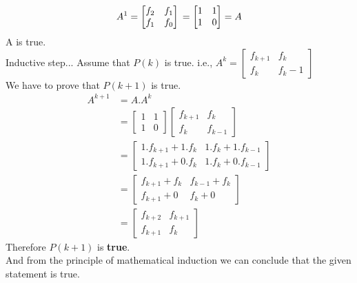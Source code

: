 \documentclass[12pt]{article}
\begin{document}
    \begin{equation}
        A^1= \begin{bmatrix}
            f_{2}&f_{1}\\
            f_{1}&f_{0}
        \end{bmatrix}\\
        =\begin{bmatrix}
            1&1\\
            1&0
        \end{bmatrix}
        = A
    \end{equation}
    A is true.\\
    Inductive step...
    Assume that $P(k)$ is true.
    i.e., $A^k=\begin{bmatrix}
    f_{k+1}&f_k\\
    f_k & f_k-1
    \end{bmatrix}$\\
    We have to prove that $P(k+1)$ is true.
    \begin{equation}
        \begin{split}
            A^{k+1}&=A.A^k\\
            &=\begin{bmatrix}
            1&1\\
            1&0
            \end{bmatrix}
            \begin{bmatrix}
            f_{k+1}& f_k\\
            f_k&f_{k-1}
            \end{bmatrix}\\
            &=\begin{bmatrix}
            1.f_{k+1}+1.f_k &1.f_{k}+1.f_{k-1}\\
            1.f_{k+1}+ 0.f_k & 1.f_k+0.f_{k-1}
            \end{bmatrix}\\
            &=\begin{bmatrix}
            f_{k+1}+f_k & f_{k-1}+f_k\\
            f_{k+1}+0 & f_{k}+0
            \end{bmatrix}\\
            &=\begin{bmatrix}
            f_{k+2} & f_{k+1}\\
            f_{k+1} & f_{k}
            \end{bmatrix}
        \end{split}
    \end{equation}
    Therefore $P(k+1)$ is \textbf{true}.\\
    And from the principle of mathematical induction we can conclude that the given statement is true.
    
\end{document}
